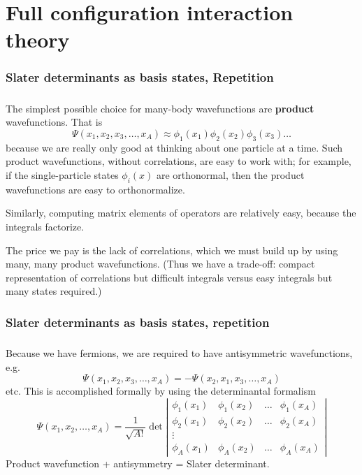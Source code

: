 
\chapter{Full configuration interaction theory}

\subsection*{Slater determinants as basis states, Repetition}

\paragraph{}
The simplest possible choice for many-body wavefunctions are \textbf{product} wavefunctions.
That is
\[ 
\Psi(x_1, x_2, x_3, \ldots, x_A) \approx \phi_1(x_1) \phi_2(x_2) \phi_3(x_3) \ldots
\]
because we are really only good  at thinking about one particle at a time. Such 
product wavefunctions, without correlations, are easy to 
work with; for example, if the single-particle states $\phi_i(x)$ are orthonormal, then 
the product wavefunctions are easy to orthonormalize.   

Similarly, computing matrix elements of operators are relatively easy, because the 
integrals factorize.

The price we pay is the lack of correlations, which we must build up by using many, many product 
wavefunctions. (Thus we have a trade-off: compact representation of correlations but 
difficult integrals versus easy integrals but many states required.)



\subsection*{Slater determinants as basis states, repetition}

\paragraph{}
Because we have fermions, we are required to have antisymmetric wavefunctions, e.g.
\[
\Psi(x_1, x_2, x_3, \ldots, x_A) = - \Psi(x_2, x_1, x_3, \ldots, x_A)
\]
etc. This is accomplished formally by using the determinantal formalism
\[
\Psi(x_1, x_2, \ldots, x_A) 
= \frac{1}{\sqrt{A!}} 
\det \left | 
\begin{array}{cccc}
\phi_1(x_1) & \phi_1(x_2) & \ldots & \phi_1(x_A) \\
\phi_2(x_1) & \phi_2(x_2) & \ldots & \phi_2(x_A) \\
 \vdots & & &  \\
\phi_A(x_1) & \phi_A(x_2) & \ldots & \phi_A(x_A) 
\end{array}
\right |
\]
Product wavefunction + antisymmetry = Slater determinant.



